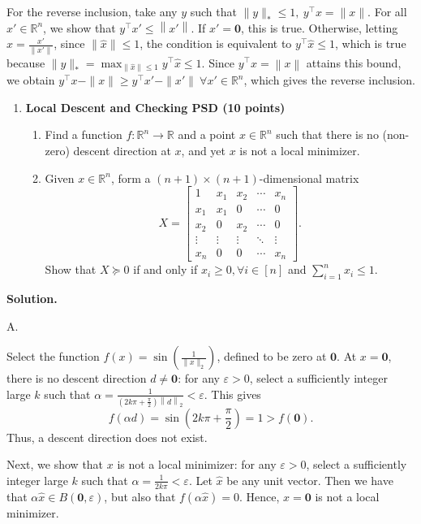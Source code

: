 \documentclass[11pt,letterpaper]{article}
\theoremstyle{definition}
\newcommand{\reals}{\mathbb{R}}
\newcommand{\solution}{\medskip\noindent\textbf{Solution.}\par\medskip}
\begin{document}
For the reverse inclusion, take any $y$ such that $\|y\|_* \leq 1, \ y^\top x = \|x\|$.
For all $x'\in \reals^n$, we show that $y^\top x' \leq \left\|x'\right\|$.
If $x'=\mathbf{0}$, this is true.
Otherwise, letting $\hat{x} = \frac{x'}{\|x'\|}$, since $\|\hat{x}\|\leq 1$, the condition is equivalent to $y^\top \hat{x}\leq 1$, which is true because $\|y\|_* =\max_{\|\hat{x}\|\leq 1}y^\top\hat{x}\leq 1$.
Since $y^\top x=\left\|x\right\|$ attains this bound, we obtain $y^\top x - \|x\|\geq y^\top x' - \| x'\|\ \forall x'\in \reals^n$, which gives the reverse inclusion.


\begin{enumerate}[resume=q]
\item \textbf{Local Descent and Checking PSD (10 points)}
\begin{enumerate}[label=\textbf{Part \Alph*.}, leftmargin=*]
\item Find a function $f : \reals^n \to \reals$ and a point $x \in \reals^n$ such that there is no (non-zero) descent direction at $x$, and yet $x$ is not a local minimizer.
\item Given $x \in \reals^n$, form a $(n + 1) \times (n + 1)$-dimensional matrix
\[
X = \begin{bmatrix}
1 & x_1 & x_2 & \cdots & x_n \\
x_1 & x_1 & 0 & \cdots & 0 \\
x_2 & 0 & x_2 & \cdots & 0 \\
\vdots & \vdots & \vdots & \ddots & \vdots \\
x_n & 0 & 0 & \cdots & x_n
\end{bmatrix}.
\]
Show that $X \succeq 0$ if and only if $x_i \geq 0, \forall i \in [n]$ and $\sum_{i=1}^n x_i \leq 1$.
\end{enumerate}
\end{enumerate}

\solution

A.

Select the function $f(x) = \sin\left(\frac{1}{\|x\|_2}\right)$, defined to be zero at $\mathbf{0}$.
At $x=\mathbf{0}$, there is no descent direction $d\neq \mathbf{0}$: for any $\varepsilon>0$, select a sufficiently integer large $k$ such that $\alpha =\frac{1}{(2k\pi + \frac{\pi}{2})\left\|d\right\|_2} < \varepsilon$.
This gives 
\[
f(\alpha d) = \sin\left(2k\pi + \frac{\pi}{2}\right) = 1>f(\mathbf{0}).
\]
Thus, a descent direction does not exist.

Next, we show that $x$ is not a local minimizer: for any $\varepsilon>0$, select a sufficiently integer large $k$ such that $\alpha =\frac{1}{2k\pi} < \varepsilon$.
Let $\hat{x}$ be any unit vector.
Then we have that $\alpha\hat{x}\in B(\mathbf{0},\varepsilon)$, but also that $f(\alpha \hat{x}) = 0$. 
Hence, $x=\mathbf{0}$ is not a local minimizer.
\end{document}
